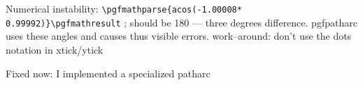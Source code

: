\documentclass{article}
\begin{document}
Numerical instability:
\verb|\pgfmathparse{acos(-1.00008* 0.99992)}\pgfmathresult|
\pgfmathresult
; should be 180 --- three degrees difference. pgfpatharc uses these angles and causes thus visible errors.  work--around: don't use the dots notation in xtick/ytick

Fixed now: I implemented a specialized patharc
\end{document}

